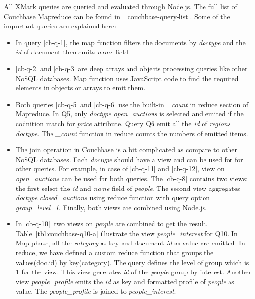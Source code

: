 All XMark queries  are queried and evaluated through Node.js. The full list of Couchbase Mapreduce can be found in ~\ref{couchbase-query-list}. Some of the important queries are explained here:


 \begin{itemize}
 \item  In query \ref{cb-q-1}, the map function filters the documents by \textit{doctype} and the \textit{id} of document then emits \textit{name} field.
 \item \ref{cb-q-2} and \ref{cb-q-3} are deep arrays and objects processing queries like other NoSQL databases. Map function uses JavaScript code to find the required elements in objects or arrays to emit them. 
 \item Both queries \ref{cb-q-5} and \ref{cb-q-6} use the built-in \textit{\_count} in reduce section of Mapreduce.  In Q5, only \textit{doctype} \textit{open\_auctions} is selected and emited if the codnition match for \textit{price} attribute. Query Q6 
 emit all the \textit{id} of \textit{regions} \textit{doctype}.  The \textit{\_count} function in reduce counts the numbers of emitted items. 
 
 \item The join operation in Couchbase is a bit complicated as compare to other NoSQL databases. Each \textit{doctype} should have a view and can be used for for other queries. For example, in case of \ref{cb-q-11} and \ref{cb-q-12}, view on \textit{open\_auctions} can be used for both queries.  The \ref{cb-q-8} contains two views: the first select the \textit{id} and \textit{name} field of \textit{people}. The second view aggregates \textit{doctype} \textit{closed\_auctions} using reduce function with query option \textit{group\_level=1}. Finally, both views are combined using Node.js. 
 
 \item In \ref{cb-q-10}, two views on \textit{people}  are combined to get the result. Table~\ref{tbl:couchbase-q10-a} illustrate the view \textit{people\_interest} for Q10. In Map phase, all the \textit{category} as key and document \textit{id} as value are emitted. In reduce, we have defined a custom reduce function that groups the values(doc.id) by key(category). The query defines the level of group which is 1 for the view. This view generates  \textit{id} of the \textit{people} group by interest. Another view \textit{people\_profile} emits the \textit{id} as key and  formatted profile of \textit{people} as value. The \textit{people\_profile} is joined to \textit{people\_interest}.
 

\end{itemize}
